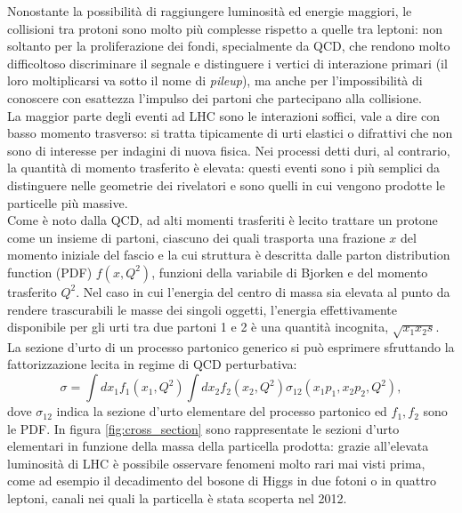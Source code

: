 \noindent Nonostante la possibilit\`a di raggiungere luminosit\`a ed energie maggiori, le collisioni tra protoni sono molto pi\`u complesse rispetto a quelle tra leptoni: non soltanto per la proliferazione dei fondi, specialmente da QCD, che rendono molto difficoltoso discriminare il segnale e distinguere i vertici di interazione primari (il loro moltiplicarsi va sotto il nome di {\itshape pileup}), ma anche per l'impossibilit\`a di conoscere con esattezza l'impulso dei partoni che partecipano alla collisione.\\
La maggior parte degli eventi ad LHC sono le interazioni soffici, vale a dire con basso momento trasverso: si tratta tipicamente di urti elastici o difrattivi che non sono di interesse per indagini di nuova fisica. Nei processi detti duri, al contrario, la quantit\`a di momento trasferito \`e elevata: questi eventi sono i pi\`u semplici da distinguere nelle geometrie dei rivelatori e sono quelli in cui vengono prodotte le particelle pi\`u massive.\\
Come \`e noto dalla QCD, ad alti momenti trasferiti \`e lecito trattare un protone come un insieme di partoni, ciascuno dei quali trasporta una frazione $x$ del momento iniziale del fascio e la cui struttura \`e descritta dalle parton distribution function (PDF) $f(x,Q^2)$, funzioni della variabile di Bjorken e del momento trasferito $Q^2$. Nel caso in cui l'energia del centro di massa sia elevata al punto da rendere trascurabili le masse dei singoli oggetti, l'energia effettivamente disponibile per gli urti tra due partoni 1 e 2 \`e una quantit\`a incognita, $\sqrt{x_1 x_2 s}$. La sezione d'urto di un processo partonico generico si pu\`o esprimere sfruttando la fattorizzazione lecita in regime di QCD perturbativa:
\begin{equation}
\sigma = \int dx_1 f_1(x_1,Q^2) \int dx_2 f_2(x_2,Q^2) \sigma_{12}(x_1 p_1, x_2 p_2, Q^2),
\end{equation}
dove $\sigma_{12}$ indica la sezione d'urto elementare del processo partonico ed $f_1,f_2$ sono le PDF. In figura \ref{fig:cross_section} sono rappresentate le sezioni d'urto elementari in funzione della massa della particella prodotta: grazie all'elevata luminosit\`a di LHC \`e possibile osservare fenomeni molto rari mai visti prima, come ad esempio il decadimento del bosone di Higgs in due fotoni o in quattro leptoni, canali nei quali la particella \`e stata scoperta nel 2012.

